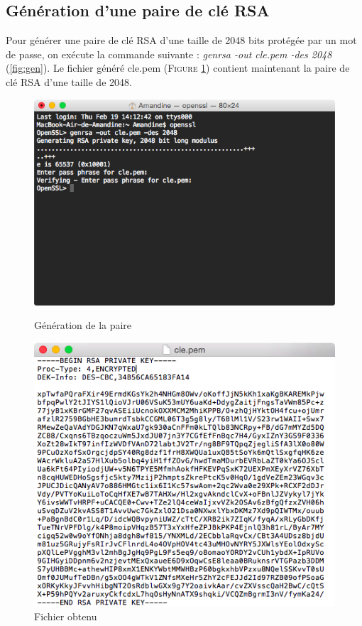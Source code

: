 \documentclass[11pt]{article}
\begin{document}
\subsection{Génération d'une paire de clé RSA}
Pour générer une paire de clé RSA d'une taille de 2048 bits protégée par un mot de passe, on exécute la commande suivante : \textit{genrsa -out cle.pem -des 2048} (\ref{fig:gen}). Le fichier généré cle.pem (\textsc{Figure \ref{fig:cle}}) contient maintenant la paire de clé RSA d'une taille de 2048.
\begin{figure}[hbtp]
    \begin{minipage}[b]{0.4\linewidth}
        \centering \includegraphics[scale=0.4]{Capture/question1.png}
        \caption{Génération de la paire}
                \label{fig:gen}
\label{fig:base}
    \end{minipage}\hfill
    \begin{minipage}[b]{0.48\linewidth}
        \centering \includegraphics[scale=0.4]{Capture/question1b.png}
        \caption{Fichier obtenu}
         \label{fig:cle}
    \end{minipage}
\end{figure}
\end{document}

